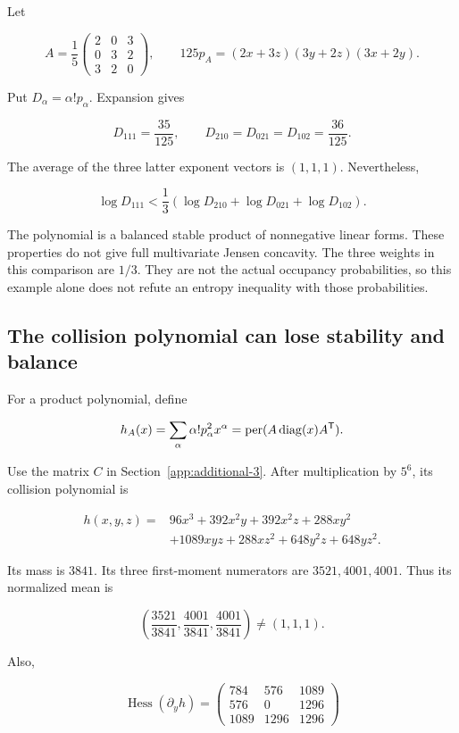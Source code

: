 Let

\[
A=\frac15\begin{pmatrix}2&0&3\\0&3&2\\3&2&0\end{pmatrix},\qquad
125p_A=(2x+3z)(3y+2z)(3x+2y).
\]

Put \(D_\alpha=\alpha!p_\alpha\). Expansion gives

\[
D_{111}=\frac{35}{125},\qquad
D_{210}=D_{021}=D_{102}=\frac{36}{125}.
\]

The average of the three latter exponent vectors is \((1,1,1)\). Nevertheless,

\[
\log D_{111}<\frac13(\log D_{210}+\log D_{021}+\log D_{102}).
\]

The polynomial is a balanced stable product of nonnegative linear forms. These properties do not give full multivariate Jensen concavity. The three weights in this comparison are \(1/3\). They are not the actual occupancy probabilities, so this example alone does not refute an entropy inequality with those probabilities.

\subsection{The collision polynomial can lose stability and balance}\label{app:additional-5}

For a product polynomial, define

\[
h_A(x)=\sum_\alpha\alpha!p_\alpha^2x^\alpha
=\operatorname{per}(A\operatorname{diag}(x)A^{\mathsf{T}}).
\]

Use the matrix \(C\) in Section~\ref{app:additional-3}. After multiplication by \(5^6\), its collision polynomial is

\[
\begin{aligned}
h(x,y,z)={}&96x^3+392x^2y+392x^2z+288xy^2\\
&+1089xyz+288xz^2+648y^2z+648yz^2.
\end{aligned}
\]

Its mass is \(3841\). Its three first-moment numerators are \(3521,4001,4001\). Thus its normalized mean is

\[
\left(\frac{3521}{3841},\frac{4001}{3841},\frac{4001}{3841}\right)
\ne(1,1,1).
\]

Also,

\[
\operatorname{Hess}(\partial_yh)=
\begin{pmatrix}784&576&1089\\576&0&1296\\1089&1296&1296\end{pmatrix}
\]


